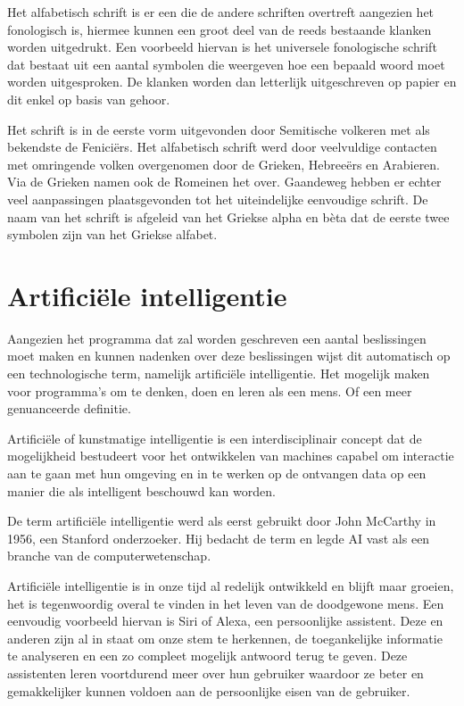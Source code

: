 Het alfabetisch schrift is er een die de andere schriften overtreft aangezien het fonologisch is, hiermee kunnen een groot deel van de reeds bestaande klanken worden uitgedrukt.
Een voorbeeld hiervan is het universele fonologische schrift dat bestaat uit een aantal symbolen die weergeven hoe een bepaald woord moet worden uitgesproken.
De klanken worden dan letterlijk uitgeschreven op papier en dit enkel op basis van gehoor.


\autocite{Rickandie2016} Het schrift is in de eerste vorm uitgevonden door Semitische volkeren met als bekendste de Feniciërs. Het alfabetisch schrift werd door veelvuldige contacten met omringende volken overgenomen door de Grieken, Hebreeërs en Arabieren. Via de Grieken namen ook de Romeinen het over. Gaandeweg hebben er echter veel aanpassingen plaatsgevonden tot het uiteindelijke eenvoudige schrift. De naam van het schrift is afgeleid van het Griekse alpha en bèta dat de eerste twee symbolen zijn van het Griekse alfabet.


\section{Artificiële intelligentie}

Aangezien het programma dat zal worden geschreven een aantal beslissingen moet maken en kunnen nadenken over deze beslissingen wijst dit automatisch op een technologische term, namelijk artificiële intelligentie.
Het mogelijk maken voor programma's om te denken, doen en leren als een mens.
Of een meer genuanceerde definitie.

Artificiële of kunstmatige intelligentie is een interdisciplinair concept dat de mogelijkheid bestudeert voor het ontwikkelen van machines capabel om interactie aan te gaan met hun omgeving en in te werken op de ontvangen data op een manier die als intelligent beschouwd kan worden.

De term artificiële intelligentie werd als eerst gebruikt door John McCarthy in 1956, een Stanford onderzoeker.
Hij bedacht de term en legde AI vast als een branche van de computerwetenschap.

Artificiële intelligentie is in onze tijd al redelijk ontwikkeld en blijft maar groeien, het is tegenwoordig overal te vinden in het leven van de doodgewone mens.
Een eenvoudig voorbeeld hiervan is Siri of Alexa, een persoonlijke assistent. Deze en anderen zijn al in staat om onze stem te herkennen, de toegankelijke informatie te analyseren en een zo compleet mogelijk antwoord terug te geven. Deze assistenten leren voortdurend meer over hun gebruiker waardoor ze beter en gemakkelijker kunnen voldoen aan de persoonlijke eisen van de gebruiker.


